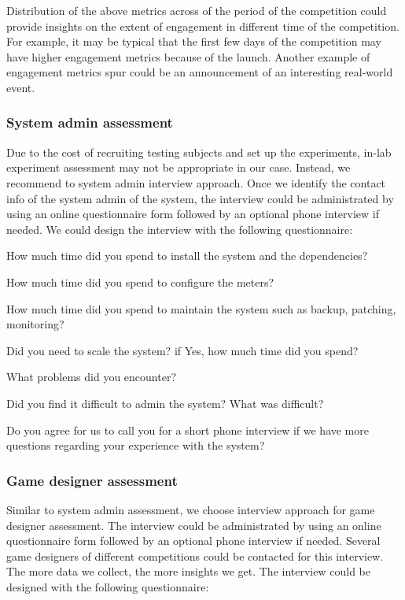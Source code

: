 Distribution of the above metrics across of the period of the competition could provide insights on 
the extent of engagement in different time of the competition. For example, it may be typical that
the first few days of the competition may have higher engagement metrics because of the launch. Another
example of engagement metrics spur could be an announcement of an interesting real-world event. 
    
\subsubsection{System admin assessment}

Due to the cost of recruiting testing subjects and set up the experiments, in-lab experiment assessment may not be appropriate in our case. Instead, we recommend to system admin interview approach. Once we identify the contact info of the system admin of the system, the interview could be administrated by using an online questionnaire form followed by an optional phone interview if needed. We could design the interview with the following questionnaire:

\begin{compactitem}
\item How much time did you spend to install the system and the dependencies?
\item How much time did you spend to configure the meters?
\item How much time did you spend to maintain the system such as backup, patching, monitoring?
\item Did you need to scale the system? if Yes, how much time did you spend?
\item What problems did you encounter?
\item Did you find it difficult to admin the system? What was difficult?
\item Do you agree for us to call you for a short phone interview if we have more questions regarding your experience with the system?
\end{compactitem}

\subsubsection{Game designer assessment}
Similar to system admin assessment, we choose interview approach for game designer assessment. The interview could be administrated by using an online questionnaire form followed by an optional phone interview if needed. Several game designers of different competitions could be contacted for this interview. The more data we collect, the more insights we get. The interview could be designed with the following questionnaire:

